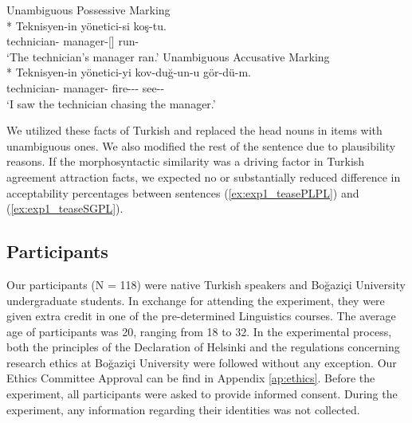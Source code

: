 \ea \label{ex:unambSentences}
    \ea \label{ex:unambPossSentence} {Unambiguous Possessive Marking}\\*
        \gll Teknisyen-in y\"onetici-{si} ko\c{s}-tu.\\
        technician-\Gen{} manager-\Poss{}[\Nom{}] run-\Pst{}\\
        \glt `The technician's manager ran.'
    \ex \label{ex:unambAccSentence} {Unambiguous Accusative Marking}\\*
        \gll Teknisyen-in y\"onetici-{yi} kov-du\u{g}-un-u g\"{o}r-d\"{u}-m.\\
        technician-\Gen{} manager-\Acc{} fire-\Nmlz-\Poss-\Acc{} see-\Pst-\Fsg{}\\
        \glt `I saw the technician chasing the manager.'
    \z
\z

We utilized these facts of Turkish and replaced the head nouns in \cites{LagoEtAl2019} items with unambiguous ones. We also modified the rest of the sentence due to plausibility reasons. If the morphosyntactic similarity was a driving factor in Turkish agreement attraction facts, we expected no or substantially reduced difference in acceptability percentages between sentences (\ref{ex:exp1_teasePLPL}) and (\ref{ex:exp1_teaseSGPL}).

\ea \label{ex:exp1MaterialTease}
    \z
\z

\subsection{Participants}
Our participants (N = 118) were native Turkish speakers and Bo\u{g}azi\c{c}i University undergraduate students. In exchange for attending the experiment, they were given extra credit in one of the pre-determined Linguistics courses. The average age of participants was 20, ranging from 18 to 32. In the experimental process, both the principles of the Declaration of Helsinki and the regulations concerning research ethics at Bo\u{g}azi\c{c}i University were followed without any exception. Our Ethics Committee Approval can be find in Appendix \ref{ap:ethics}. Before the experiment, all participants were asked to provide informed consent. During the experiment, any information regarding their identities was not collected. 

